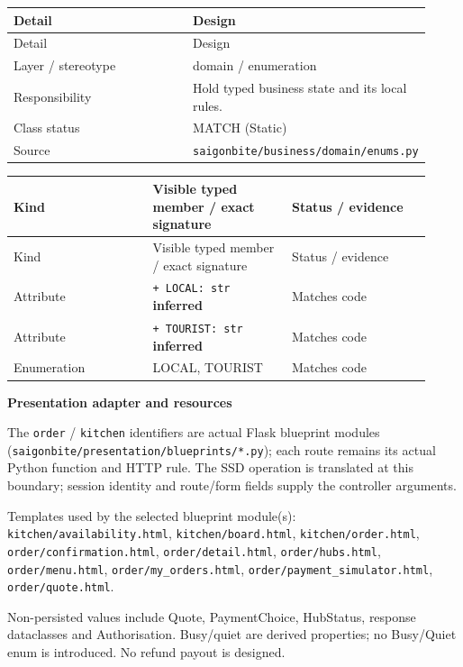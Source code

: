 \begin{longtable}{>{\raggedright\arraybackslash}p{0.4600\linewidth}>{\raggedright\arraybackslash}p{0.4600\linewidth}}
Detail & Design \\
\hline\endfirsthead
Detail & Design \\
\hline\endhead
Layer / stereotype & domain / \guillemotleft{}enumeration\guillemotright{} \\
Responsibility & Hold typed business state and its local rules. \\
Class status & MATCH (Static) \\
Source & \texttt{saigonbite/\allowbreak{}business/\allowbreak{}domain/\allowbreak{}enums.\allowbreak{}py} \\
\end{longtable}
\begin{longtable}{>{\raggedright\arraybackslash}p{0.3067\linewidth}>{\raggedright\arraybackslash}p{0.3067\linewidth}>{\raggedright\arraybackslash}p{0.3067\linewidth}}
Kind & Visible typed member / exact signature & Status / evidence \\
\hline\endfirsthead
Kind & Visible typed member / exact signature & Status / evidence \\
\hline\endhead
Attribute & \texttt{+ LOCAL: str} \textbf{inferred} & Matches code \\
Attribute & \texttt{+ TOURIST: str} \textbf{inferred} & Matches code \\
Enumeration & LOCAL, TOURIST & Matches code \\
\end{longtable}
\textbf{Presentation adapter and resources}

The \texttt{order} / \texttt{kitchen} identifiers are actual Flask blueprint modules (\texttt{saigonbite/\allowbreak{}presentation/\allowbreak{}blueprints/\allowbreak{}*.\allowbreak{}py}); each route remains its actual Python function and HTTP rule. The SSD operation is translated at this boundary; session identity and route/form fields supply the controller arguments.

Templates used by the selected blueprint module(s): \texttt{kitchen/\allowbreak{}availability.\allowbreak{}html}, \texttt{kitchen/\allowbreak{}board.\allowbreak{}html}, \texttt{kitchen/\allowbreak{}order.\allowbreak{}html}, \texttt{order/\allowbreak{}confirmation.\allowbreak{}html}, \texttt{order/\allowbreak{}detail.\allowbreak{}html}, \texttt{order/\allowbreak{}hubs.\allowbreak{}html}, \texttt{order/\allowbreak{}menu.\allowbreak{}html}, \texttt{order/\allowbreak{}my\_\allowbreak{}orders.\allowbreak{}html}, \texttt{order/\allowbreak{}payment\_\allowbreak{}simulator.\allowbreak{}html}, \texttt{order/\allowbreak{}quote.\allowbreak{}html}.

Non-persisted values include Quote, PaymentChoice, HubStatus, response dataclasses and Authorisation. Busy/quiet are derived properties; no Busy/Quiet enum is introduced. No refund payout is designed.
